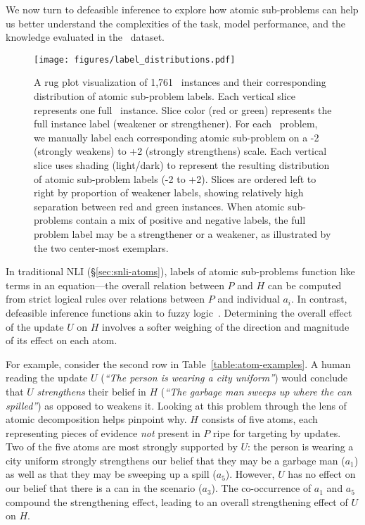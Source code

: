 We now turn to defeasible inference to explore how atomic sub-problems can help us better understand the complexities of the task, model performance, and the knowledge evaluated in the \dsnli~dataset.

\begin{figure*}[t!]
\centering
\texttt{[image: figures/label\_distributions.pdf]}
\caption{A rug plot visualization of 1,761 \dsnli~instances and their corresponding distribution of atomic sub-problem labels. Each vertical slice represents one full \dsnli~instance. Slice color (red or green) represents the full instance label (weakener or strengthener). For each \dsnli~problem, we manually label each corresponding atomic sub-problem on a -2 (strongly weakens) to +2 (strongly strengthens) scale. Each vertical slice uses shading (light/dark) to represent the resulting distribution of atomic sub-problem labels (-2 to +2). Slices are ordered left to right by proportion of weakener labels, showing relatively high separation between red and green instances. When atomic sub-problems contain a mix of positive and negative labels, the full problem label may be a strengthener or a weakener, as illustrated by the two center-most exemplars.}


\label{fig:label-distribution}
\end{figure*}

In traditional NLI (\S\ref{sec:snli-atoms}), labels of atomic sub-problems function like terms in an equation---the overall relation between $P$ and $H$ can be computed from strict logical rules over relations between $P$ and individual $a_i$.
%
In contrast, defeasible inference functions akin to fuzzy logic~\cite{castro1998non}.
%
Determining the overall effect of the update $U$ on $H$ involves a softer weighing of the direction and magnitude of its effect on each atom.
%

For example, consider the second row in Table~\ref{table:atom-examples}. 
%
A human reading the update $U$ (\textit{``The person is wearing a city uniform''}) would conclude that $U$ \textit{strengthens} their belief in $H$ (\textit{``The garbage man sweeps up where the can spilled''}) as opposed to weakens it.
%
Looking at this problem through the lens of atomic decomposition helps pinpoint why.
%
$H$ consists of five atoms, each representing pieces of evidence \textit{not} present in $P$ ripe for targeting by updates.
%
Two of the five atoms are most strongly supported by $U$: the person is wearing a city uniform strongly strengthens our belief that they may be a garbage man ($a_1$) as well as that they may be sweeping up a spill ($a_5$). 
%
However, $U$ has no effect on our belief that there is a can in the scenario ($a_3$).
%
The co-occurrence of $a_1$ and $a_5$ compound the strengthening effect, leading to an overall strengthening effect of $U$ on $H$.


